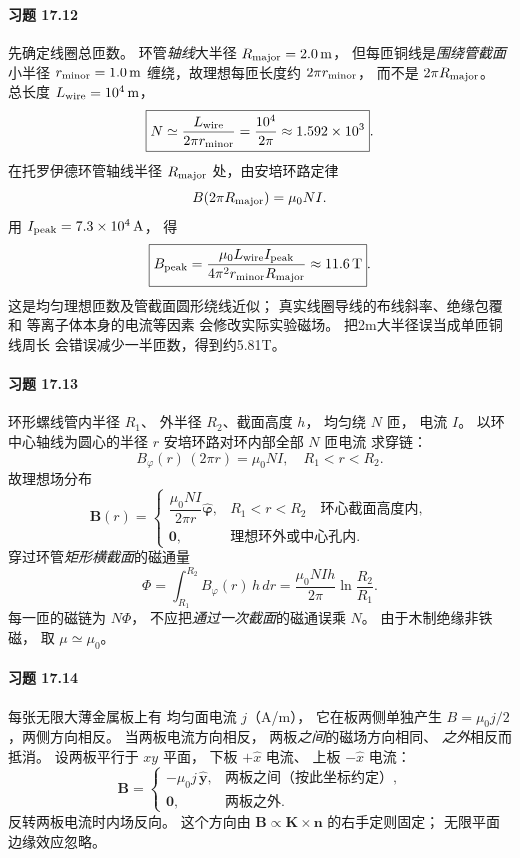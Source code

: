 \paragraph{习题 17.12}
先确定线圈总匝数。
环管\emph{轴线}大半径
\(R_{\rm major}=2.0\,\mathrm m\)，
但每匝铜线是\emph{围绕管截面}
小半径 \(r_{\rm minor}=1.0\,\mathrm m\)
缠绕，故理想每匝长度约
\(2\pi r_{\rm minor}\)，
而不是 \(2\pi R_{\rm major}\)。
总长度 \(L_{\rm wire}=10^4\,\mathrm m\)，
\[
 \boxed{N\simeq\frac{L_{\rm wire}}
 {2\pi r_{\rm minor}}
 =\frac{10^4}{2\pi}\approx1.592\times10^3}.
\]
在托罗伊德环管轴线半径 \(R_{\rm major}\)
处，由安培环路定律
\[
 B(2\pi R_{\rm major})=\mu_0NI.
\]
用 \(I_{\rm peak}=7.3\times10^4\,\mathrm A\)，
得
\[
 \boxed{B_{\rm peak}=
 \frac{\mu_0L_{\rm wire}I_{\rm peak}}
 {4\pi^2r_{\rm minor}R_{\rm major}}
 \approx11.6\,\mathrm T}.
\]
这是均匀理想匝数及管截面圆形绕线近似；
真实线圈导线的布线斜率、绝缘包覆和
等离子体本身的电流等因素
会修改实际实验磁场。
把2m大半径误当成单匝铜线周长
会错误减少一半匝数，得到约5.81T。

\paragraph{习题 17.13}
环形螺线管内半径 \(R_1\)、
外半径 \(R_2\)、截面高度 \(h\)，
均匀绕 \(N\) 匝，
电流 \(I\)。
以环中心轴线为圆心的半径 \(r\)
安培环路对环内部全部 \(N\) 匝电流
求穿链：
\[
 B_\varphi(r)\,(2\pi r)=\mu_0NI,
\quad R_1<r<R_2.
\]
故理想场分布
\[
 \boxed{\boldsymbol B(r)=
 \begin{cases}
 \dfrac{\mu_0NI}{2\pi r}\hat{\boldsymbol\varphi},
 &R_1<r<R_2\quad\text{环心截面高度内},\\
 \boldsymbol0,&\text{理想环外或中心孔内}.
 \end{cases}}
\]
穿过环管\emph{矩形横截面}的磁通量
\[
 \boxed{\Phi=
 \int_{R_1}^{R_2}B_\varphi(r)\,h\,dr
 =\frac{\mu_0NIh}{2\pi}
 \ln\frac{R_2}{R_1}}.
\]
每一匝的磁链为 \(N\Phi\)，
不应把\emph{通过一次截面}的磁通误乘 \(N\)。
由于木制绝缘非铁磁，
取 \(\mu\simeq\mu_0\)。

\paragraph{习题 17.14}
每张无限大薄金属板上有
均匀面电流 \(j\)（A/m），
它在板两侧单独产生
\(B=\mu_0j/2\)，两侧方向相反。
当两板电流方向相反，
两板\emph{之间}的磁场方向相同、
\emph{之外}相反而抵消。
设两板平行于 \(xy\) 平面，
下板 \(+\hat x\) 电流、
上板 \(-\hat x\) 电流：
\[
 \boxed{\boldsymbol B=
 \begin{cases}
 -\mu_0j\,\hat{\boldsymbol y},&
 \text{两板之间（按此坐标约定）},\\
 \boldsymbol0,&\text{两板之外}.
 \end{cases}}
\]
反转两板电流时内场反向。
这个方向由
\(\boldsymbol B\propto
\boldsymbol K\times\boldsymbol n\)
的右手定则固定；
无限平面边缘效应忽略。

